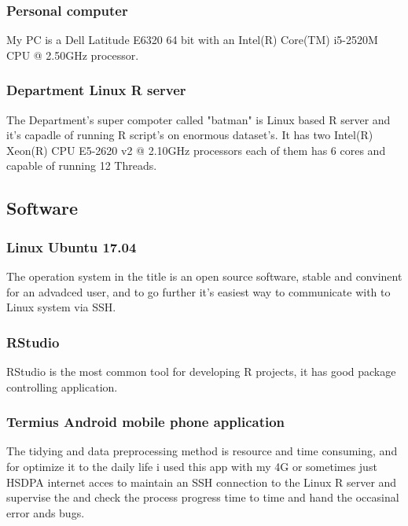 			\subsubsection{Personal computer}
My PC is a Dell Latitude E6320 64 bit with an Intel(R) Core(TM) i5-2520M CPU @ 2.50GHz processor.
			\subsubsection{Department Linux R server}
The Department's super compoter called "batman" is Linux based R server and it's capadle of running R script's on enormous dataset's. It has two Intel(R) Xeon(R) CPU E5-2620 v2 @ 2.10GHz processors each of them has 6 cores and capable of running 12 Threads.
		\subsection{Software}
			\subsubsection{Linux Ubuntu 17.04}
The operation system in the title is an open source software, stable and convinent for an advadced user, and to go further it's easiest way to communicate with to Linux system via SSH.
			\subsubsection{RStudio}
RStudio is the most common tool for developing R projects, it has good package controlling application.
			\subsubsection{Termius Android mobile phone application}
The tidying and data preprocessing method is resource and time consuming, and for optimize it to the daily life i used this app with my 4G or sometimes just HSDPA internet acces to maintain an SSH connection to the Linux R server and supervise the and check the process progress time to time and hand the occasinal error ands bugs.
